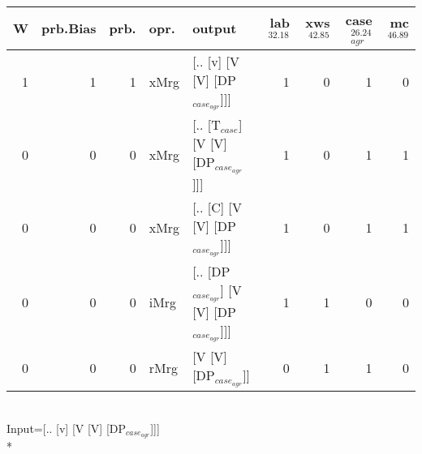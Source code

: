 \begin{tabularx}{\linewidth}{rrrlXrrrr}
\hline
   W &   prb.Bias &   prb. & opr.   & output                                   &   lab$^{32.18}$ &   xws$^{42.85}$ &   case$_{agr}^{26.24}$ &   mc$^{46.89}$ \\
\hline
   1 &       1 &   1 & xMrg & [.. [v] [V [V] [DP$_{case_{agr}}$]]]           &             1 &             0 &                  1 &            0 \\
   0 &       0 &   0 & xMrg & [.. [T$_{case}$] [V [V] [DP$_{case_{agr}}$]]]      &             1 &             0 &                  1 &            1 \\
   0 &       0 &   0 & xMrg & [.. [C] [V [V] [DP$_{case_{agr}}$]]]           &             1 &             0 &                  1 &            1 \\
   0 &       0 &   0 & iMrg & [.. [DP$_{case_{agr}}$] [V [V] [DP$_{case_{agr}}$]]] &             1 &             1 &                  0 &            0 \\
   0 &       0 &   0 & rMrg & [V [V] [DP$_{case_{agr}}$]]                    &             0 &             1 &                  1 &            0 \\
\hline
\end{tabularx}\endgroup\\
\begingroup\scriptsize Input=[.. [v] [V [V] [DP$_{case_{agr}}$]]]\\*
